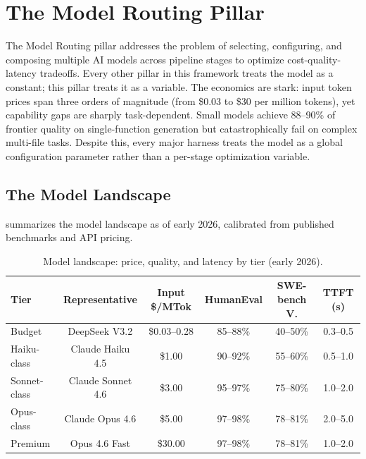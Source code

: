 \section{The Model Routing Pillar}
\label{sec:routing}

The Model Routing pillar addresses the problem of selecting, configuring, and composing multiple AI models across pipeline stages to optimize cost-quality-latency tradeoffs. Every other pillar in this framework treats the model as a constant; this pillar treats it as a variable. The economics are stark: input token prices span three orders of magnitude (from \$0.03 to \$30 per million tokens), yet capability gaps are sharply task-dependent. Small models achieve 88--90\% of frontier quality on single-function generation but catastrophically fail on complex multi-file tasks. Despite this, every major harness treats the model as a global configuration parameter rather than a per-stage optimization variable.

\subsection{The Model Landscape}

 summarizes the model landscape as of early 2026, calibrated from published benchmarks and API pricing.

\begin{table}[htbp]
\centering
\caption{Model landscape: price, quality, and latency by tier (early 2026).}
\label{tab:model-landscape}
\small
\begin{tabular}{lccccc}
\toprule
\textbf{Tier} & \textbf{Representative} & \textbf{Input \$/MTok} & \textbf{HumanEval} & \textbf{SWE-bench V.} & \textbf{TTFT (s)} \\
\midrule
Budget & DeepSeek V3.2 & \$0.03--0.28 & 85--88\% & 40--50\% & 0.3--0.5 \\
Haiku-class & Claude Haiku 4.5 & \$1.00 & 90--92\% & 55--60\% & 0.5--1.0 \\
Sonnet-class & Claude Sonnet 4.6 & \$3.00 & 95--97\% & 75--80\% & 1.0--2.0 \\
Opus-class & Claude Opus 4.6 & \$5.00 & 97--98\% & 78--81\% & 2.0--5.0 \\
Premium & Opus 4.6 Fast & \$30.00 & 97--98\% & 78--81\% & 1.0--2.0 \\
\bottomrule
\end{tabular}
\end{table}

